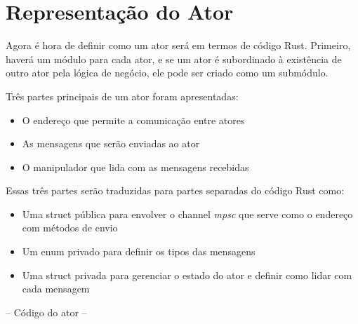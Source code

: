 \section{Representação do Ator}

Agora é hora de definir como um ator será em termos de código Rust. Primeiro, haverá um módulo para cada ator, e se um ator é subordinado à existência de outro ator pela lógica de negócio, ele pode ser criado como um submódulo.

Três partes principais de um ator foram apresentadas:

\begin{itemize}
    \item O endereço que permite a comunicação entre atores
    \item As mensagens que serão enviadas ao ator
    \item O manipulador que lida com as mensagens recebidas
\end{itemize}

Essas três partes serão traduzidas para partes separadas do código Rust como:

\begin{itemize}
    \item Uma struct pública para envolver o channel \emph{mpsc} que serve como o endereço com métodos de envio
    \item Um enum privado para definir os tipos das mensagens
    \item Uma struct privada para gerenciar o estado do ator e definir como lidar com cada mensagem
\end{itemize}

-- Código do ator -- 
